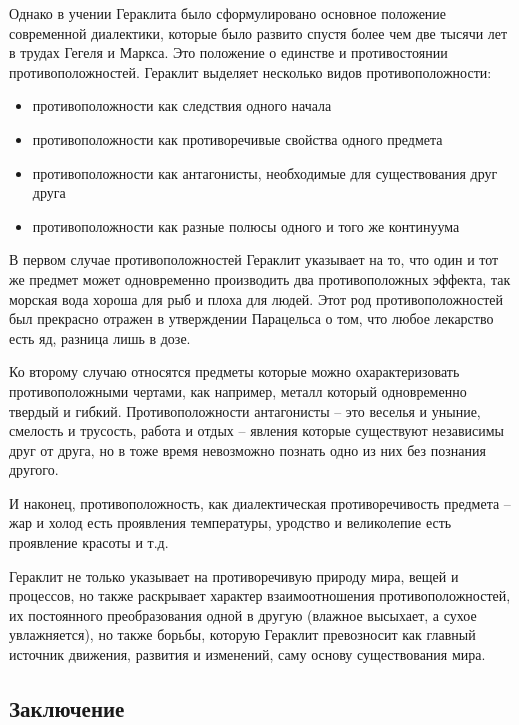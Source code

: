 \documentclass[
]{article}
\providecommand{\tightlist}{%
  \setlength{\itemsep}{0pt}\setlength{\parskip}{0pt}}
\begin{document}
Однако в учении Гераклита было сформулировано основное положение
современной диалектики, которые было развито спустя более чем две тысячи
лет в трудах Гегеля и Маркса. Это положение о единстве и противостоянии
противоположностей. Гераклит выделяет несколько видов противоположности:

\begin{itemize}
\tightlist
\item
  противоположности как следствия одного начала
\item
  противоположности как противоречивые свойства одного предмета
\item
  противоположности как антагонисты, необходимые для существования друг
  друга
\item
  противоположности как разные полюсы одного и того же континуума
\end{itemize}

В первом случае противоположностей Гераклит указывает на то, что один и
тот же предмет может одновременно производить два противоположных
эффекта, так морская вода хороша для рыб и плоха для людей. Этот род
противоположностей был прекрасно отражен в утверждении Парацельса о том,
что любое лекарство есть яд, разница лишь в дозе.

Ко второму случаю относятся предметы которые можно охарактеризовать
противоположными чертами, как например, металл который одновременно
твердый и гибкий. Противоположности антагонисты -- это веселья и уныние,
смелость и трусость, работа и отдых -- явления которые существуют
независимы друг от друга, но в тоже время невозможно познать одно из них
без познания другого.

И наконец, противоположность, как диалектическая противоречивость
предмета -- жар и холод есть проявления температуры, уродство и
великолепие есть проявление красоты и т.д.

Гераклит не только указывает на противоречивую природу мира, вещей и
процессов, но также раскрывает характер взаимоотношения
противоположностей, их постоянного преобразования одной в другую
(влажное высыхает, а сухое увлажняется), но также борьбы, которую
Гераклит превозносит как главный источник движения, развития и
изменений, саму основу существования мира.

\hypertarget{ux437ux430ux43aux43bux44eux447ux435ux43dux438ux435-2}{%
\subsection{Заключение}\label{ux437ux430ux43aux43bux44eux447ux435ux43dux438ux435-2}}
\end{document}
